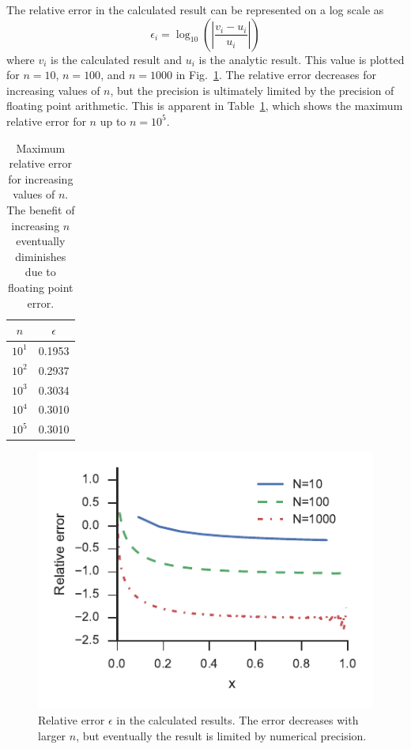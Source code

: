 \documentclass{article}
\begin{document}
            The relative error in the calculated result can be represented on a log scale as
            \begin{equation}
                \epsilon_i = \log_{10}\left(\left| \frac{v_i - u_i}{u_i} \right| \right)
            \end{equation}
            where $v_i$ is the calculated result and $u_i$ is the analytic result. This value is plotted for $n=10$, $n=100$, and $n=1000$ in Fig.~\ref{fig:relerror}. The relative error decreases for increasing values of $n$, but the precision is ultimately limited by the precision of floating point arithmetic. This is apparent in Table~\ref{tab:error}, which shows the maximum relative error for $n$ up to $n=10^5$.

            \begin{table}
                \centering
                \begin{tabular}{cc}
                    \toprule
                    $n$    & $\epsilon$ \\
                    \midrule
                    $10^1$ & 0.1953 \\
                    $10^2$ & 0.2937 \\
                    $10^3$ & 0.3034 \\
                    $10^4$ & 0.3010 \\
                    $10^5$ & 0.3010 \\
                    \bottomrule
                \end{tabular}
                \caption{Maximum relative error for increasing values of $n$. The benefit of increasing $n$ eventually diminishes due to floating point error.}
                \label{tab:error}
            \end{table}

            \begin{figure}
                \centering
                \includegraphics{relerror.pdf}
                \caption{Relative error $\epsilon$ in the calculated results. The error decreases with larger $n$, but eventually the result is limited by numerical precision.}
                \label{fig:relerror}
            \end{figure}
\end{document}
